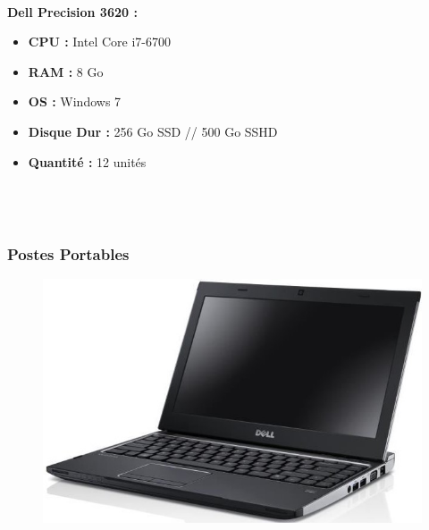 \documentclass[11pt,a4paper,twoside]{article}
\begin{document}
\paragraph{}\textbf{Dell Precision 3620 :} \\
\begin{itemize}
\item \textbf{CPU :} Intel Core i7-6700
\item \textbf{RAM :} 8 Go
\item \textbf{OS :} Windows 7
\item \textbf{Disque Dur :} 256 Go SSD // 500 Go SSHD
\item \textbf{Quantité :} 12 unités
\\ \\ \\ \\
\end{itemize}
\newpage

\subsubsection{Postes Portables}
\begin{figure}
\includegraphics[scale=0.4]{Ressources/Materiel/V131.jpg}\vspace{-2cm}
\end{figure}
\end{document}
